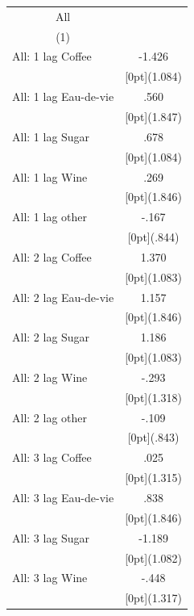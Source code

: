 \documentclass[12pt,a4paper,titlepage]{article}
\begin{document}
{\newpage
{}

\begin{tabular*}{\textwidth}{@{\extracolsep{\fill}}lc}	
	\multicolumn{1}{c}{All} \\
\cline{2-2}	
	\multicolumn{1}{c}{(1)} \\
\hline	
All: 1 lag Coffee &	-1.426 \\
&	\raisebox{.7ex}[0pt]{\scriptsize (1.084)} \\
All: 1 lag Eau-de-vie &	.560 \\
&	\raisebox{.7ex}[0pt]{\scriptsize (1.847)} \\
All: 1 lag Sugar &	.678 \\
&	\raisebox{.7ex}[0pt]{\scriptsize (1.084)} \\
All: 1 lag Wine &	.269 \\
&	\raisebox{.7ex}[0pt]{\scriptsize (1.846)} \\
All: 1 lag other &	-.167 \\
&	\raisebox{.7ex}[0pt]{\scriptsize (.844)} \\
All: 2 lag Coffee &	1.370 \\
&	\raisebox{.7ex}[0pt]{\scriptsize (1.083)} \\
All: 2 lag Eau-de-vie &	1.157 \\
&	\raisebox{.7ex}[0pt]{\scriptsize (1.846)} \\
All: 2 lag Sugar &	1.186 \\
&	\raisebox{.7ex}[0pt]{\scriptsize (1.083)} \\
All: 2 lag Wine &	-.293 \\
&	\raisebox{.7ex}[0pt]{\scriptsize (1.318)} \\
All: 2 lag other &	-.109 \\
&	\raisebox{.7ex}[0pt]{\scriptsize (.843)} \\
All: 3 lag Coffee &	.025 \\
&	\raisebox{.7ex}[0pt]{\scriptsize (1.315)} \\
All: 3 lag Eau-de-vie &	.838 \\
&	\raisebox{.7ex}[0pt]{\scriptsize (1.846)} \\
All: 3 lag Sugar &	-1.189 \\
&	\raisebox{.7ex}[0pt]{\scriptsize (1.082)} \\
All: 3 lag Wine &	-.448 \\
&	\raisebox{.7ex}[0pt]{\scriptsize (1.317)} \\

\end{tabular*}}
\end{document}

